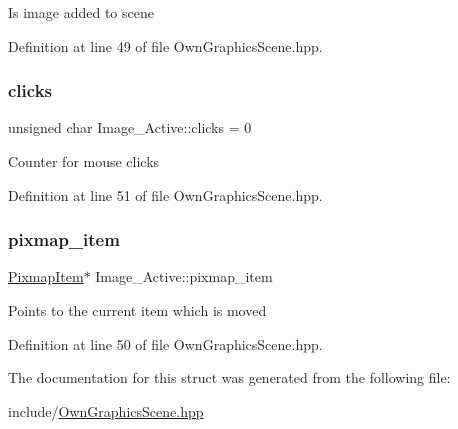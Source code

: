 Is image added to scene 

Definition at line 49 of file Own\+Graphics\+Scene.\+hpp.

\mbox{\label{structImage__Active_abb039226daf0372a8d88c842f5eb140f}} 
\subsubsection{\texorpdfstring{clicks}{clicks}}
{\footnotesize\ttfamily unsigned char Image\+\_\+\+Active\+::clicks = 0}

Counter for mouse clicks 

Definition at line 51 of file Own\+Graphics\+Scene.\+hpp.

\mbox{\label{structImage__Active_aa007ea3c9ba4830bbc2706af51820c20}} 
\subsubsection{\texorpdfstring{pixmap\+\_\+item}{pixmap\_item}}
{\footnotesize\ttfamily \mbox{\hyperlink{classPixmapItem}{Pixmap\+Item}}$\ast$ Image\+\_\+\+Active\+::pixmap\+\_\+item}

Points to the current item which is moved 

Definition at line 50 of file Own\+Graphics\+Scene.\+hpp.



The documentation for this struct was generated from the following file\+:\begin{DoxyCompactItemize}
\item 
include/\mbox{\hyperlink{OwnGraphicsScene_8hpp}{Own\+Graphics\+Scene.\+hpp}}\end{DoxyCompactItemize}
